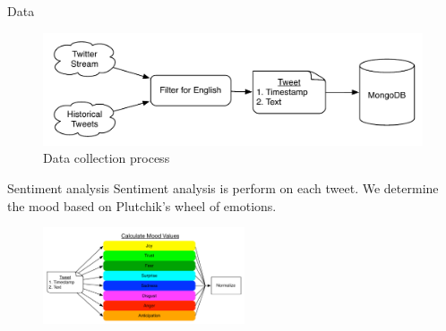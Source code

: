 \documentclass[final,table]{beamer}
\newlength{\twocolwid}
\newcommand{\spar}{\vspace{26pt}\noindent}
\begin{document}
\begin{frame}[t]
\begin{columns}[t]
\begin{column}{\twocolwid}
\begin{block}{Data}
\begin{figure}
          \includegraphics[width=70ex]{tweet_filtering.pdf}
          \caption{Data collection process}
\end{figure}


\end{block}


\begin{block}{Sentiment analysis}
Sentiment analysis is perform on each tweet. We determine the mood based on Plutchik's wheel of emotions. 

\begin{center}
\begin{figure}[ht!]
\includegraphics[width=0.53\textwidth]{sentiment_scoring.pdf}
\end{figure}
\end{center}





\end{block}
\end{column}
\end{columns}
\end{frame}
\end{document}
